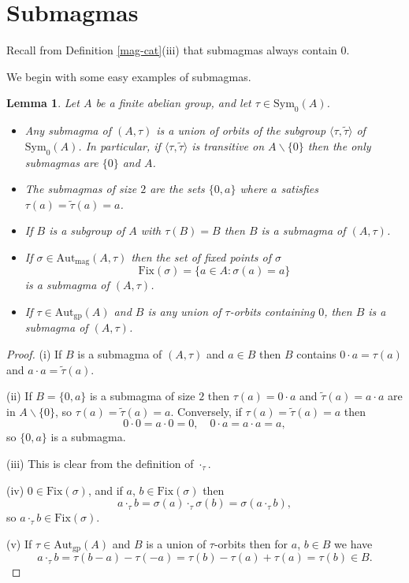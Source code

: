 \documentclass[letterpaper,12pt]{amsart}
\numberwithin{equation}{section}
\numberwithin{algorithm}{section}
\newtheorem{lemma}{Lemma}[section]
\theoremstyle{definition}
\newcommand{\Autgp}{\mathrm{Aut}_{\mathrm{gp}}}
\newcommand{\Autmag}{\mathrm{Aut}_\mathrm{mag}}
\newcommand{\Symo}{\mathrm{Sym}_0}
\newcommand{\ttau}{\tilde{\tau}}
\newcommand{\bs}{\backslash}
\newcommand{\Fix}{\mathrm{Fix}}
\begin{document}
\section{Submagmas}

Recall from Definition \ref{mag-cat}(iii) that submagmas always contain $0$.

We begin with some easy examples of submagmas.

\begin{lemma}  \label{submags}
	Let $A$ be a finite abelian group, and let $\tau \in \Symo(A)$.
	\begin{itemize}
		\item[(i)] Any submagma of $(A,\tau)$ is a union of orbits of the subgroup $\langle \tau, \ttau\rangle$ of $\Symo(A)$. In particular, if $\langle \tau, \ttau\rangle$ is transitive on $A\bs\{0\}$ then the only submagmas are $\{0\}$ and $A$.
		\item[(ii)] The submagmas of size $2$ are the sets $\{0,a\}$ where $a$ satisfies $\tau(a)=\ttau(a)=a$.
		\item[(iii)] If $B$ is a subgroup of $A$ with $\tau(B)=B$ then $B$ is a submagma of $(A,\tau)$. 
		\item[(iv)] If $\sigma \in \Autmag(A,\tau)$ then the set of fixed points of $\sigma$
		$$   \Fix(\sigma)=\{ a \in A : \sigma(a) =a \} $$
		is a submagma of $(A,\tau)$. 
		\item[(v)] If $\tau \in \Autgp(A)$ and $B$ is any union of $\tau$-orbits containing $0$, then $B$ is a submagma of $(A,\tau)$. 
	\end{itemize}
\end{lemma}
\begin{proof}
	(i) If $B$ is a submagma of $(A,\tau)$ and $a \in B$ then $B$ contains $0 \cdot a = \tau(a)$ and $a \cdot a = \ttau(a)$.
	
	(ii) If $B=\{0,a\}$ is a submagma of size $2$ then $\tau(a)=0 \cdot a$ and $\ttau(a) = a \cdot a$ are in $A \bs\{0\}$, so $\tau(a)=\ttau(a)=a$. Conversely, if $\tau(a)=\ttau(a)=a$ then
	$$ 0 \cdot 0 = a \cdot 0 = 0, \quad 0 \cdot a = a \cdot a =a, $$
	so $\{0,a\}$ is a submagma.
	
	(iii) This is clear from the definition of $\cdot_\tau$.
	
	(iv) $0 \in \Fix(\sigma)$, and if $a$, $b \in \Fix(\sigma)$ then 
	$$ a \cdot_\tau b = \sigma(a) \cdot_\tau \sigma(b) = \sigma(a \cdot_\tau b), $$
	so $a \cdot_\tau b \in \Fix(\sigma)$. 
	
	(v) If $\tau \in \Autgp(A)$ and $B$ is a union of $\tau$-orbits then for $a$, $b \in B$ we have 
	$$ a \cdot_\tau b = \tau(b-a)-\tau(-a) = \tau(b)-\tau(a)+\tau(a)=\tau(b) \in B. $$
\end{proof}
\end{document}
